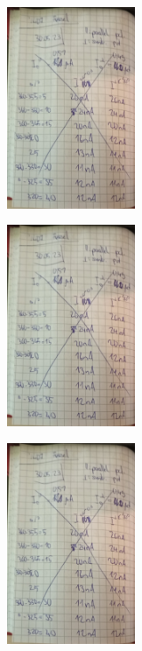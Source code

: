 \begin{minipage}[t]{0.4\textwidth}
   \includegraphics[height=6cm, page=1]{Abbildungen/Buch 10.06.2023.pdf}
\end{minipage}
\begin{minipage}[t]{0.4\textwidth}
   \includegraphics[height=6cm, keepaspectratio, page=2]{Abbildungen/Buch 10.06.2023.pdf}
\end{minipage}
\begin{minipage}[t]{0.4\textwidth}
    \includegraphics[height=6cm, page=3]{Abbildungen/Buch 10.06.2023.pdf}
 \end{minipage}


